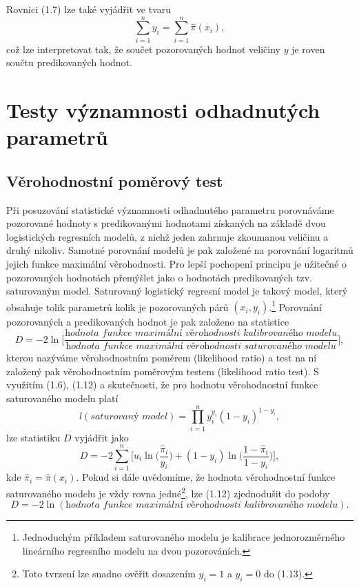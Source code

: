 Rovnici (1.7) lze také vyjádřit ve tvaru
\begin{equation}
\sum_{i = 1}^n y_i = \sum_{i = 1}^n \hat{\pi}(x_i),
\end{equation}
což lze interpretovat tak, že součet pozorovaných hodnot veličiny $y$ je roven součtu predikovaných hodnot.

\section{Testy významnosti odhadnutých parametrů}

\subsection{Věrohodnostní poměrový test}

Při posuzování statistické významnosti odhadnutého parametru porovnáváme pozorované hodnoty s predikovanými hodnotami získaných na základě dvou logistických regresních modelů, z nichž jeden zahrnuje zkoumanou veličinu a druhý nikoliv. Samotné porovnání modelů je pak založené na porovnání logaritmů jejich funkce maximální věrohodnosti. Pro lepší pochopení principu je užitečné o pozorovaných hodnotách přemýšlet jako o hodnotách predikovaných tzv. saturovaným model. Saturovaný logistický regresní model je takový model, který obsahuje tolik parametrů kolik je pozorovaných párů $(x_i, y_i)$.\footnote{Jednoduchým příkladem saturovaného modelu je kalibrace jednorozměrného lineárního regresního modelu na dvou pozorováních.} Porovnání pozorovaných a predikovaných hodnot je pak založeno na statistice
\begin{equation}
D = -2 \ln \Big[\frac{\textit{hodnota funkce maximální věrohodnosti kalibrovaného modelu}}{\textit{hodnota funkce maximální věrohodnosti saturovaného modelu}}\Big],
\end{equation}
kterou nazýváme věrohodnostním poměrem (likelihood ratio) a test na ní založený pak věrohodnostním poměrovým testem (likelihood ratio test). S využitím (1.6), (1.12) a skutečnosti, že pro hodnotu věrohodnostní funkce saturovaného modelu platí
\begin{equation}
l(\textit{saturovaný model}) = \prod_{i = 1}^n y_i^{y_i}(1 - y_i)^{1 - y_i},
\end{equation}
lze statistiku $D$ vyjádřit jako
\begin{equation}
D = -2 \sum_{i = 1}^n \Big[u_i \ln\Big( \frac{\hat{\pi}_i}{y_i} \Big) + (1 - y_i) \ln \Big( \frac{1 - \hat{\pi}_i}{1 - y_i} \Big) \Big],
\end{equation}
kde $\hat{\pi}_i = \hat{\pi}(x_i)$. Pokud si dále uvědomíme, že hodnota věrohodnostní funkce saturovaného modelu je vždy rovna jedné\footnote{Toto tvrzení lze snadno ověřit dosazením $y_i = 1$ a $y_i = 0$ do (1.13).}, lze (1.12) zjednodušit do podoby
\begin{equation}
D = -2 \ln (\textit{hodnota funkce maximální věrohodnosti kalibrovaného modelu}).
\end{equation}

